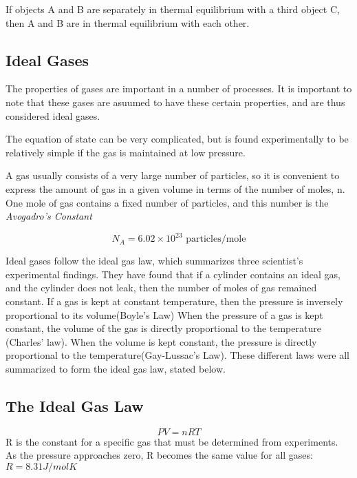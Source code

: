 \begin{defi}
If objects A and B are separately in thermal equilibrium with a third object C, then A and B are in thermal equilibrium with each other.
\end{defi}

\subsection{Ideal Gases}
The properties of gases are important in a number of processes. It is important to note that these gases are asuumed to have these certain properties, and are thus considered ideal gases.

The equation of state can be very complicated, but is found experimentally to be relatively simple if the gas is maintained at low pressure.

A gas usually consists of a very large number of particles, so it is convenient to express the amount of gas in a given volume in terms of the number of moles, n. One mole of gas contains a fixed number of particles, and this number is the \emph{Avogadro's Constant}
\begin{defi}
$$N_A = 6.02 \times 10^{23} \textrm{ particles/mole}$$
\end{defi}

Ideal gases follow the ideal gas law, which summarizes three scientist's experimental findings. They have found that if a cylinder contains an ideal gas, and the cylinder does not leak, then the number of moles of gas remained constant. If a gas is kept at constant temperature, then the pressure is inversely proportional to its volume(Boyle's Law) When the pressure of a gas is kept constant, the volume of the gas is directly proportional to the temperature (Charles' law). When the volume is kept constant, the pressure is directly proportional to the temperature(Gay-Lussac's Law). These different laws were all summarized to form the ideal gas law, stated below.

\subsection{The Ideal Gas Law}
\begin{defi}
$$PV=nRT$$
R is the constant for a specific gas that must be determined from experiments. As the pressure approaches zero, R becomes the same value for all gases: $R=8.31 J/mol K$
\end{defi}

